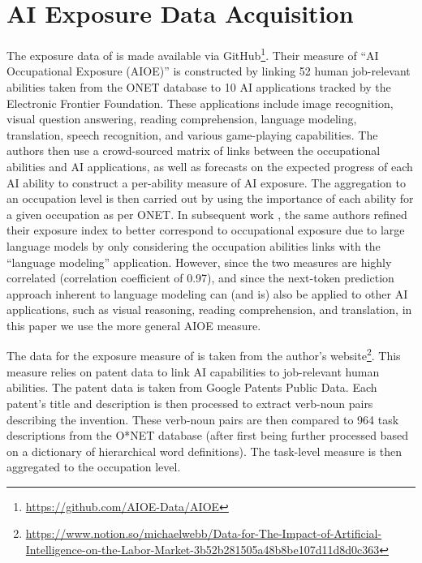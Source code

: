 \documentclass[11pt]{article}
\begin{document}
\section{AI Exposure Data Acquisition}
\label{sec:data_appendix}

The exposure data of \citet{felten_method_2018} is made available via GitHub\footnote{\url{https://github.com/AIOE-Data/AIOE}}. Their measure of ``AI Occupational Exposure (AIOE)'' is constructed by linking 52 human job-relevant abilities taken from the ONET database to 10 AI applications tracked by the Electronic Frontier Foundation. These applications include image recognition, visual question answering, reading comprehension, language modeling, translation, speech recognition, and various game-playing capabilities. The authors then use a crowd-sourced matrix of links between the occupational abilities and AI applications, as well as forecasts on the expected progress of each AI ability to construct a per-ability measure of AI exposure. The aggregation to an occupation level is then carried out by using the importance of each ability for a given occupation as per ONET. In subsequent work \cite{felten_how_2023}, the same authors refined their exposure index to better correspond to occupational exposure due to large language models by only considering the occupation abilities links with the ``language modeling'' application. However, since the two measures are highly correlated (correlation coefficient of 0.97), and since the next-token prediction approach inherent to language modeling can (and is) also be applied to other AI applications, such as visual reasoning, reading comprehension, and translation, in this paper we use the more general AIOE measure.

The data for the exposure measure of \citet{webb_impact_2022} is taken from the author's website\footnote{\url{https://www.notion.so/michaelwebb/Data-for-The-Impact-of-Artificial-Intelligence-on-the-Labor-Market-3b52b281505a48b8be107d11d8d0c363}}. This measure relies on patent data to link AI capabilities to job-relevant human abilities. The patent data is taken from Google Patents Public Data. Each patent's title and description is then processed to extract verb-noun pairs describing the invention. These verb-noun pairs are then compared to 964 task descriptions from the O*NET database (after first being further processed based on a dictionary of hierarchical word definitions). The task-level measure is then aggregated to the occupation level.
\end{document}
